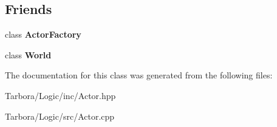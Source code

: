 \subsection*{Friends}
\begin{DoxyCompactItemize}
\item 
\mbox{\label{classTarbora_1_1ActorTest_a6ab97c7737ba5ca6e4cb3a4621c48421}} 
class {\bfseries Actor\+Factory}
\item 
\mbox{\label{classTarbora_1_1ActorTest_a7b4bcdf992c21ae83363f25df05b1d25}} 
class {\bfseries World}
\end{DoxyCompactItemize}


The documentation for this class was generated from the following files\+:\begin{DoxyCompactItemize}
\item 
Tarbora/\+Logic/inc/Actor.\+hpp\item 
Tarbora/\+Logic/src/Actor.\+cpp\end{DoxyCompactItemize}

